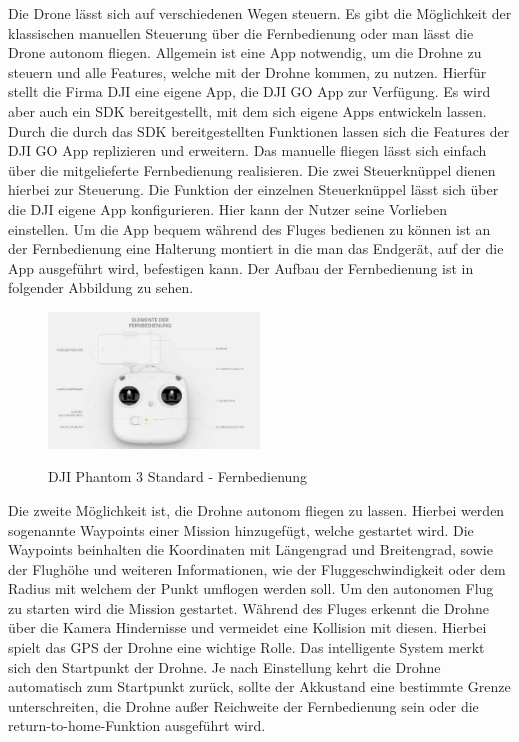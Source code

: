 Die Drone lässt sich auf verschiedenen Wegen steuern. Es gibt die Möglichkeit der klassischen manuellen Steuerung über die Fernbedienung oder man lässt die Drone autonom fliegen. 
\newline
Allgemein ist eine App notwendig, um die Drohne zu steuern und alle Features, welche mit der Drohne kommen, zu nutzen. Hierfür stellt die Firma DJI eine eigene App, die DJI GO App zur Verfügung. Es wird aber auch ein \acf{SDK} bereitgestellt, mit dem sich eigene Apps entwickeln lassen. Durch die durch das \acl{SDK} bereitgestellten Funktionen lassen sich die Features der DJI GO App replizieren und erweitern.
\newline
Das manuelle fliegen lässt sich einfach über die mitgelieferte Fernbedienung realisieren. Die zwei Steuerknüppel dienen hierbei zur Steuerung. Die Funktion der einzelnen Steuerknüppel lässt sich über die DJI eigene App konfigurieren. Hier kann der Nutzer seine Vorlieben einstellen. 
\newline
Um die App bequem während des Fluges bedienen zu können ist an der Fernbedienung eine Halterung montiert in die man das Endgerät, auf der die App ausgeführt wird, befestigen kann. 
\newline
Der Aufbau der Fernbedienung ist in folgender Abbildung zu sehen.
\begin{figure}[H]
	\begin{center}
		{\includegraphics[width=0.5\textwidth]{images/DJI_Fernbedienung.png}}
		\caption{DJI Phantom 3 Standard - Fernbedienung}
	\end{center}
\end{figure}
Die zweite Möglichkeit ist, die Drohne autonom fliegen zu lassen. Hierbei werden sogenannte Waypoints einer Mission hinzugefügt, welche gestartet wird. Die Waypoints beinhalten die Koordinaten mit Längengrad und Breitengrad, sowie der Flughöhe und weiteren Informationen, wie der Fluggeschwindigkeit oder dem Radius mit welchem der Punkt umflogen werden soll. Um den autonomen Flug zu starten wird die Mission gestartet. Während des Fluges erkennt die Drohne über die Kamera Hindernisse und vermeidet eine Kollision mit diesen. 
\newline
Hierbei spielt das \acf{GPS} der Drohne eine wichtige Rolle. Das intelligente System merkt sich den Startpunkt der Drohne. Je nach Einstellung kehrt die Drohne automatisch zum Startpunkt zurück, sollte der Akkustand eine bestimmte Grenze unterschreiten, die Drohne außer Reichweite der Fernbedienung sein oder die return-to-home-Funktion ausgeführt wird.

